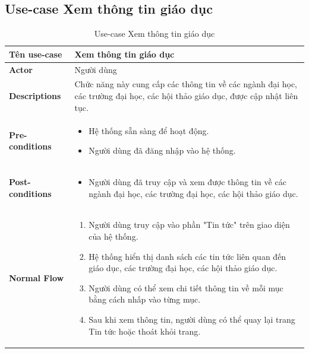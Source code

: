 \subsection{Use-case Xem thông tin giáo dục}
    \begin{longtable}[H]{|l|p{}|}
        \caption{Use-case Xem thông tin giáo dục}
        \\ \hline
        \textbf{Tên use-case} & Xem thông tin giáo dục \\
        \hline
        \textbf{Actor} & Người dùng \\
        \hline
        \textbf{Descriptions} & Chức năng này cung cấp các thông tin về các ngành đại học, các trường đại học, các hội thảo giáo dục, được cập nhật liên tục. \\
        \hline
        \textbf{Pre-conditions} & \vspace{-0.75cm} \begin{itemize}[leftmargin=4mm]
            \setlength\itemsep{0em}
            \item Hệ thống sẵn sàng để hoạt động.
            \item Người dùng đã đăng nhập vào hệ thống.
        \end{itemize} \\
        
        \hline

        \textbf{Post-conditions} & \vspace{-0.75cm} \begin{itemize}[leftmargin=4mm]
            \setlength\itemsep{0em}
            \item Người dùng đã truy cập và xem được thông tin về các ngành đại học, các trường đại học, các hội thảo giáo dục.
        \end{itemize} \\
            
        \hline
        
        \textbf{Normal Flow} & \vspace{-0.75cm} 
                \begin{enumerate}[leftmargin=5.5mm]
                    \setlength\itemsep{0em}
                    \item Người dùng truy cập vào phần "Tin tức" trên giao diện của hệ thống.
                    \item Hệ thống hiển thị danh sách các tin tức liên quan đến giáo dục, các trường đại học, các hội thảo giáo dục.
                    \item Người dùng có thể xem chi tiết thông tin về mỗi mục bằng cách nhấp vào từng mục.
                    \item Sau khi xem thông tin, người dùng có thể quay lại trang Tin tức hoặc thoát khỏi trang. 
                \end{enumerate}\\
                

\end{longtable}
